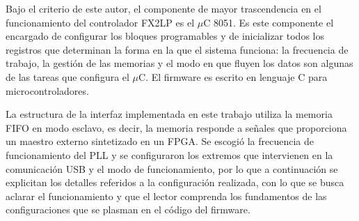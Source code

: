 %
%

%
%
%

Bajo el criterio de este autor, el componente de mayor trascendencia en el funcionamiento del controlador FX2LP es el $\mu$C 8051. Es este componente el encargado de configurar los bloques programables y de inicializar todos los registros que determinan la forma en la que el sistema funciona: la frecuencia de trabajo, la gestión de las memorias y el modo en que fluyen los datos son algunas de las tareas que configura el $\mu$C. El firmware es escrito en lenguaje C para microcontroladores. 

La estructura de la interfaz implementada en este trabajo utiliza la memoria FIFO en modo esclavo, es decir, la memoria responde a señales que proporciona un maestro externo sintetizado en un FPGA. Se escogió la frecuencia de funcionamiento del PLL y se configuraron los extremos que intervienen en la comunicación USB y el modo de funcionamiento, por lo que a continuación se explicitan los detalles referidos a la configuración realizada, con lo que se busca aclarar el funcionamiento y que el lector comprenda los fundamentos de las configuraciones que se plasman en el código del firmware.


